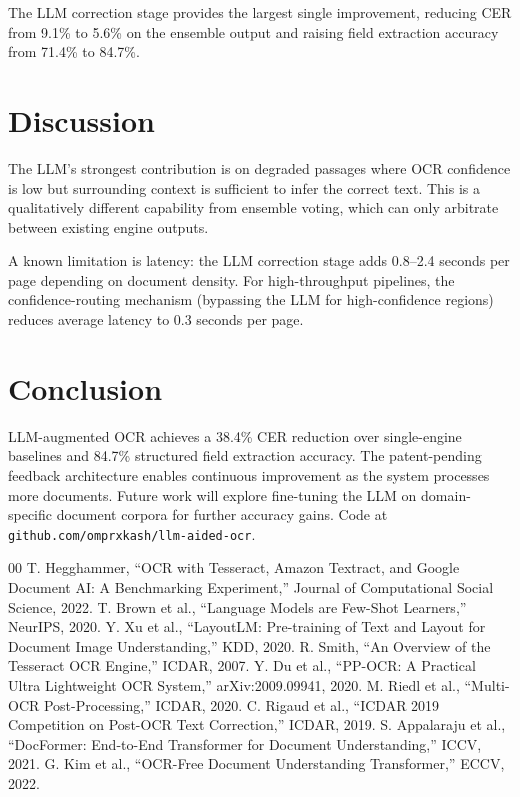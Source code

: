 \documentclass[conference]{IEEEtran}
\begin{document}
The LLM correction stage provides the largest single improvement, reducing CER from 9.1\% to 5.6\% on the ensemble output and raising field extraction accuracy from 71.4\% to 84.7\%.

\section{Discussion}

The LLM's strongest contribution is on degraded passages where OCR confidence is low but surrounding context is sufficient to infer the correct text. This is a qualitatively different capability from ensemble voting, which can only arbitrate between existing engine outputs.

A known limitation is latency: the LLM correction stage adds 0.8--2.4 seconds per page depending on document density. For high-throughput pipelines, the confidence-routing mechanism (bypassing the LLM for high-confidence regions) reduces average latency to 0.3 seconds per page.

\section{Conclusion}

LLM-augmented OCR achieves a 38.4\% CER reduction over single-engine baselines and 84.7\% structured field extraction accuracy. The patent-pending feedback architecture enables continuous improvement as the system processes more documents. Future work will explore fine-tuning the LLM on domain-specific document corpora for further accuracy gains. Code at \texttt{github.com/omprxkash/llm-aided-ocr}.

\begin{thebibliography}{00}
 T. Hegghammer, ``OCR with Tesseract, Amazon Textract, and Google Document AI: A Benchmarking Experiment,'' Journal of Computational Social Science, 2022.
 T. Brown et al., ``Language Models are Few-Shot Learners,'' NeurIPS, 2020.
 Y. Xu et al., ``LayoutLM: Pre-training of Text and Layout for Document Image Understanding,'' KDD, 2020.
 R. Smith, ``An Overview of the Tesseract OCR Engine,'' ICDAR, 2007.
 Y. Du et al., ``PP-OCR: A Practical Ultra Lightweight OCR System,'' arXiv:2009.09941, 2020.
 M. Riedl et al., ``Multi-OCR Post-Processing,'' ICDAR, 2020.
 C. Rigaud et al., ``ICDAR 2019 Competition on Post-OCR Text Correction,'' ICDAR, 2019.
 S. Appalaraju et al., ``DocFormer: End-to-End Transformer for Document Understanding,'' ICCV, 2021.
 G. Kim et al., ``OCR-Free Document Understanding Transformer,'' ECCV, 2022.
\end{thebibliography}
\end{document}
